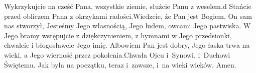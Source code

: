 
\startpsalmusx[title={Psalm 100}] %
\startlines
Wykrzykujcie na cześć Pana, wszystkie ziemie,\pmed
służcie Panu z weselem.d
Stańcie przed obliczem Pana\pmed
z okrzykami radości.\startnarrower[5mm]
Wiedzcie, że Pan jest Bogiem,\pmed
On sam nas stworzył,
Jesteśmy Jego własnością,\pmed
Jego ludem, owcami Jego pastwiska.\stopnarrower
W Jego bramy wstępujcie z dziękczynieniem,\pflx
z hymnami w Jego przedsionki,\pmed
chwalcie i błogosławcie Jego imię.
Albowiem Pan jest dobry,\pflx
Jego łaska trwa na wieki,\pmed
a Jego wierność przez pokolenia.\startnarrower[5mm]
Chwała Ojcu i~Synowi,\pmed
i~Duchowi Świętemu.
Jak była na początku, teraz i~zawsze,\pmed
i~na wieki wieków. Amen.\stopnarrower\stoplines
\endinput

